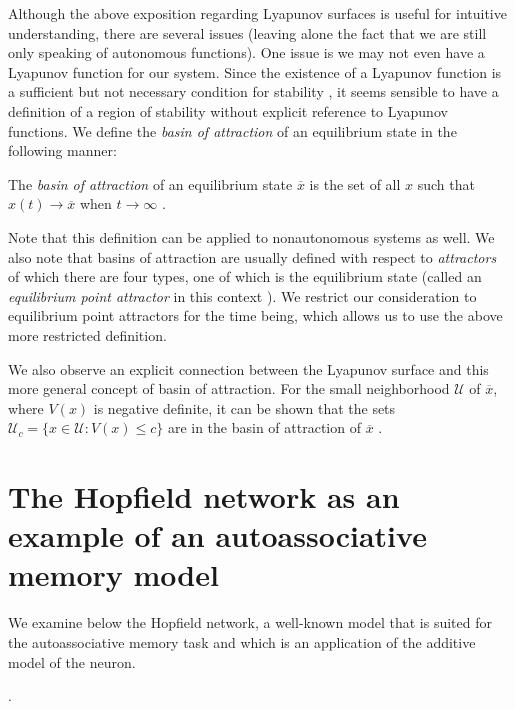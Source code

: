 Although the above exposition regarding Lyapunov surfaces is useful for intuitive understanding, there are several issues (leaving alone the fact that we are still only speaking of autonomous functions). One issue is we may not even have a Lyapunov function for our system. Since the existence of a Lyapunov function is a sufficient but not necessary condition for stability \cite[p. 683]{Haykin:2009:NNC:1213811}, it seems sensible to have a definition of a region of stability without explicit reference to Lyapunov functions. We define the \emph{basin of attraction} of an equilibrium state in the following manner:

\begin{definition}
The \emph{basin of attraction} of an equilibrium state $\overline{x}$ is the set of all $x$ such that $x(t) \to \overline{x}$ when $t \to \infty$ \cite{ocostin}.
\end{definition}

Note that this definition can be applied to nonautonomous systems as well. We also note that basins of attraction are usually defined with respect to \emph{attractors} of which there are four types, one of which is the equilibrium state (called an \emph{equilibrium point attractor} in this context \cite[p. 179]{DBLP:journals/ai/Beer95}). We restrict our consideration to equilibrium point attractors for the time being, which allows us to use the above more restricted definition.

We also observe an explicit connection between the Lyapunov surface and this more general concept of basin of attraction. For the small neighborhood $\mathcal{U}$ of $\overline{x}$, where $V(x)$ is negative definite, it can be shown that the sets $\mathcal{U}_c = \{x \in \mathcal{U} : V(x) \leq c\}$ are in the basin of attraction of $\overline{x}$ \cite{anovozhilov}.

\section{The Hopfield network as an example of an autoassociative memory model}

We examine below the Hopfield network, a well-known model that is suited for the autoassociative memory task and which is an application of the additive model of the neuron.

\cite{Yegnanarayana:2004:ANN:1197006}.

